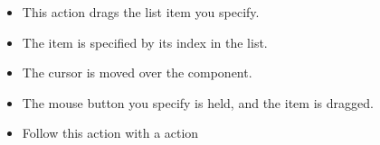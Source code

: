 
\begin{itemize}
\item This action drags the list item you specify.
\item The item is specified by its index in the list.
\item The cursor is moved over the component.
\item The mouse button you specify is held, and the item is dragged. 
\item Follow this action with a  action
\end{itemize}



